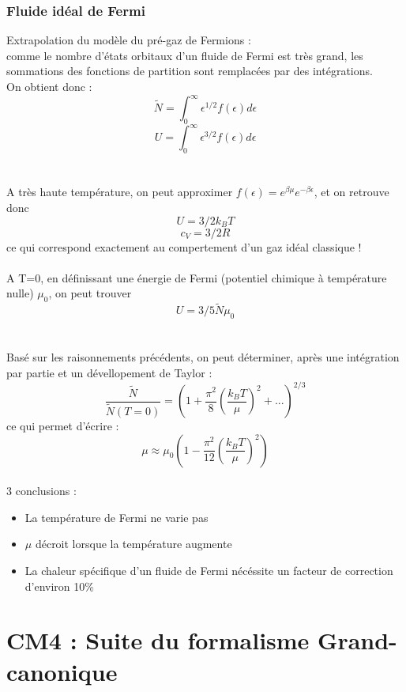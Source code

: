 \documentclass{article}
\begin{document}
        \subsubsection{Fluide idéal de Fermi}
            Extrapolation du modèle du pré-gaz de Fermions :\\ comme le nombre d'états orbitaux d'un fluide de Fermi est très grand, les sommations des fonctions de partition sont remplacées par des intégrations.\\
            On obtient donc :
            $$
            \tilde N = \int_{0}^{\infty} \epsilon^{1/2} f(\epsilon) d\epsilon
            $$
            $$
            U = \int_{0}^{\infty} \epsilon^{3/2} f(\epsilon) d\epsilon
            $$\\\\
            A très haute température, on peut approximer $f(\epsilon) = e^{\beta \mu} e^{- \beta \epsilon}$, et on retrouve donc
            $$
            U = 3/2 k_B T
            $$
            $$
            c_V = 3/2 R
            $$
            ce qui correspond exactement au compertement d'un gaz idéal classique ! \\\\
            A T=0, en définissant une énergie de Fermi (potentiel chimique à température nulle) $\mu_0$, on peut trouver
            $$
            U = 3/5 \tilde N \mu_0
            $$\\\\
            Basé sur les raisonnements précédents, on peut déterminer, après une intégration par partie et un dévellopement de Taylor : 
            $$
            \frac{\tilde N}{\tilde N (T = 0)} = (1 + \frac{\pi^2}{8}(\frac{k_B T}{\mu})^2 + ...)^{2/3}
            $$
            ce qui permet d'écrire :
            $$
            \mu \approx \mu_0 (1 - \frac{\pi^2}{12}(\frac{k_B T}{\mu})^2)
            $$\\
            3 conclusions :
            \begin{itemize}
                \item La température de Fermi ne varie pas
                \item $\mu$ décroit lorsque la température augmente
                \item La chaleur spécifique d'un fluide de Fermi nécéssite un facteur de correction d'environ 10\%
            \end{itemize}
\pagebreak

\section{CM4 : Suite du formalisme Grand-canonique}
\end{document}
